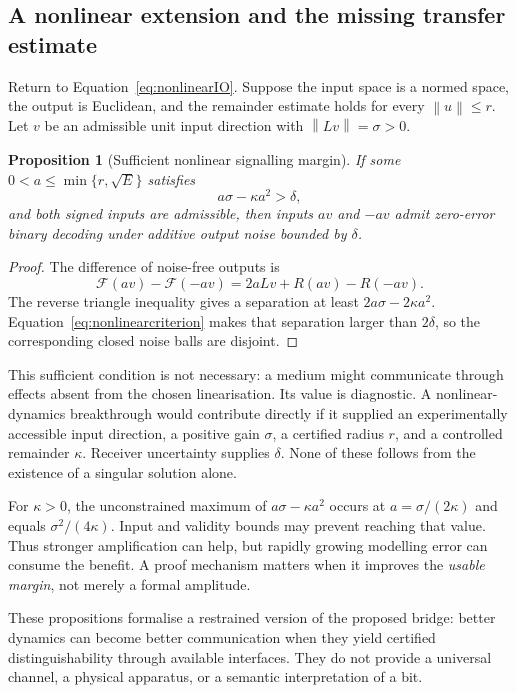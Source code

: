 \documentclass[11pt,a4paper]{article}
\newtheorem{proposition}[theorem]{Proposition}
\theoremstyle{definition}
\theoremstyle{remark}
\newcommand{\norm}[1]{\left\lVert#1\right\rVert}
\begin{document}
\subsection{A nonlinear extension and the missing transfer estimate}
Return to Equation~\eqref{eq:nonlinearIO}. Suppose the input space is a normed space, the output is Euclidean, and the remainder estimate holds for every $\norm{u}\leq r$. Let $v$ be an admissible unit input direction with $\norm{Lv}=\sigma>0$.

\begin{proposition}[Sufficient nonlinear signalling margin]\label{prop:nonlinearbit}
If some $0<a\leq\min\{r,\sqrt E\}$ satisfies
\begin{equation}\label{eq:nonlinearcriterion}
 a\sigma-\kappa a^2>\delta,
\end{equation}
and both signed inputs are admissible, then inputs $av$ and $-av$ admit zero-error binary decoding under additive output noise bounded by $\delta$.
\end{proposition}
\begin{proof}
The difference of noise-free outputs is
\[
 \mathcal F(av)-\mathcal F(-av)=2aLv+R(av)-R(-av).
\]
The reverse triangle inequality gives a separation at least $2a\sigma-2\kappa a^2$. Equation~\eqref{eq:nonlinearcriterion} makes that separation larger than $2\delta$, so the corresponding closed noise balls are disjoint.
\end{proof}
This sufficient condition is not necessary: a medium might communicate through effects absent from the chosen linearisation. Its value is diagnostic. A nonlinear-dynamics breakthrough would contribute directly if it supplied an experimentally accessible input direction, a positive gain $\sigma$, a certified radius $r$, and a controlled remainder $\kappa$. Receiver uncertainty supplies $\delta$. None of these follows from the existence of a singular solution alone.

For $\kappa>0$, the unconstrained maximum of $a\sigma-\kappa a^2$ occurs at $a=\sigma/(2\kappa)$ and equals $\sigma^2/(4\kappa)$. Input and validity bounds may prevent reaching that value. Thus stronger amplification can help, but rapidly growing modelling error can consume the benefit. A proof mechanism matters when it improves the \emph{usable margin}, not merely a formal amplitude.

These propositions formalise a restrained version of the proposed bridge: better dynamics can become better communication when they yield certified distinguishability through available interfaces. They do not provide a universal channel, a physical apparatus, or a semantic interpretation of a bit.
\end{document}
